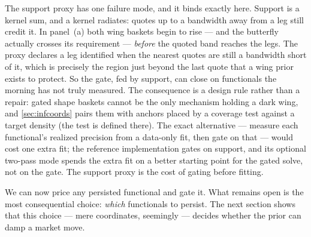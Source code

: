 The support proxy has one failure mode, and it binds exactly here.
Support is a kernel sum, and a kernel radiates: quotes up to a
bandwidth away from a leg still credit it.  In panel~(a) both wing
baskets begin to rise --- and the butterfly actually crosses its
requirement --- \emph{before} the quoted band reaches the legs.  The
proxy declares a leg identified when the nearest quotes are still a
bandwidth short of it, which is precisely the region just beyond the
last quote that a wing prior exists to protect.  So the gate, fed by
support, can close on functionals the morning has not truly
measured.  The consequence is a design rule rather than a repair:
gated shape baskets cannot be the only mechanism holding a dark
wing, and \cref{sec:infcoords} pairs them with anchors placed by a
coverage test against a target density (the test is defined
there).  The exact alternative ---
measure each functional's realized precision from a data-only fit,
then gate on that --- would cost one extra fit; the reference
implementation gates on support, and its optional two-pass mode
spends the extra fit on a better starting point for the gated
solve, not on the gate.  The support
proxy is the cost of gating before fitting.

We can now price any persisted functional and gate it.  What remains
open is the most consequential choice: \emph{which} functionals to
persist.  The next section shows that this choice --- mere
coordinates, seemingly --- decides whether the prior can damp a
market move.
